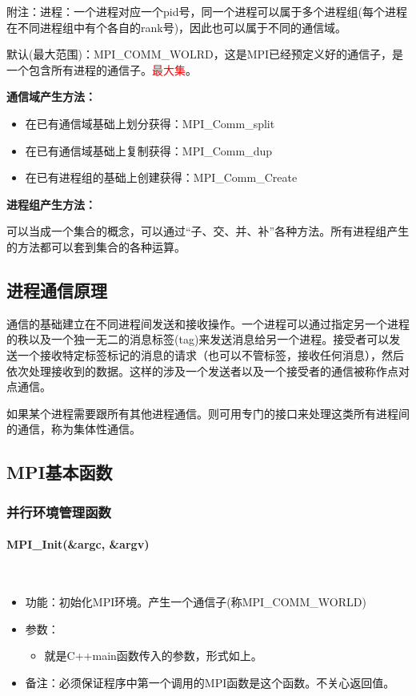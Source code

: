 \documentclass[UTF8]{article}%
\begin{document}
附注：进程：一个进程对应一个pid号，同一个进程可以属于多个进程组(每个进程在不同进程组中有个各自的rank号)，因此也可以属于不同的通信域。

默认(最大范围)：MPI\_COMM\_WOLRD，这是MPI已经预定义好的通信子，是一个包含所有进程的通信子。\textcolor{red}{最大集}。

\textbf{通信域产生方法：}

\begin{itemize}
    \item 在已有通信域基础上划分获得：MPI\_Comm\_split
    \item 在已有通信域基础上复制获得：MPI\_Comm\_dup
    \item 在已有进程组的基础上创建获得：MPI\_Comm\_Create
\end{itemize}

\textbf{进程组产生方法：}

可以当成一个集合的概念，可以通过“子、交、并、补”各种方法。所有进程组产生的方法都可以套到集合的各种运算。

\subsection{进程通信原理}

通信的基础建立在不同进程间发送和接收操作。一个进程可以通过指定另一个进程的秩以及一个独一无二的消息标签(tag)来发送消息给另一个进程。接受者可以发送一个接收特定标签标记的消息的请求（也可以不管标签，接收任何消息），然后依次处理接收到的数据。这样的涉及一个发送者以及一个接受者的通信被称作点对点通信。

如果某个进程需要跟所有其他进程通信。则可用专门的接口来处理这类所有进程间的通信，称为集体性通信。

\subsection{MPI基本函数}

\subsubsection{并行环境管理函数}

\paragraph{MPI\_Init(\&argc, \&argv)}~{}

\begin{itemize}
    \item 功能：初始化MPI环境。产生一个通信子(称MPI\_COMM\_WORLD)
    \item 参数：
    {
        \begin{itemize}
            \item 就是C++main函数传入的参数，形式如上。
        \end{itemize}
    }
    \item 备注：必须保证程序中第一个调用的MPI函数是这个函数。不关心返回值。
\end{itemize}
\end{document}
